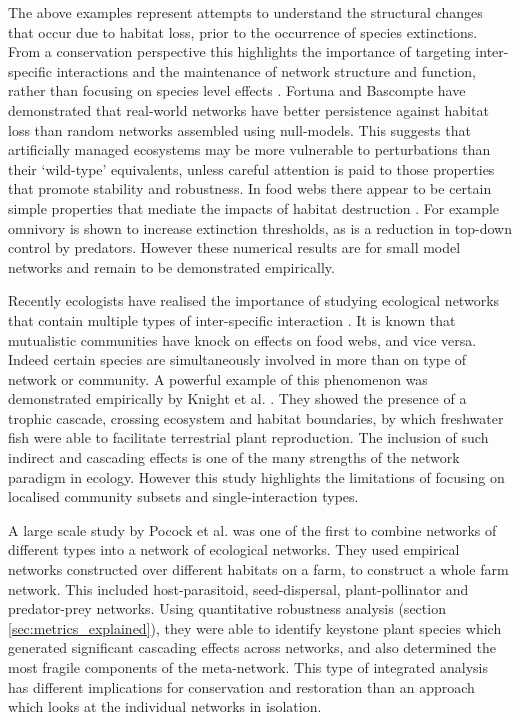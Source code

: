 The above examples represent attempts to understand the structural changes that occur due to habitat loss, prior to the occurrence of species extinctions. From a conservation perspective this highlights the importance of targeting inter-specific interactions and the maintenance of network structure and function, rather than focusing on species level effects \cite{memmott2007conservation}. Fortuna and Bascompte \cite{fortuna2006habitat} have demonstrated that real-world networks have better persistence against habitat loss than random networks assembled using null-models. This suggests that artificially managed ecosystems may be more vulnerable to perturbations than their `wild-type' equivalents, unless careful attention is paid to those properties that promote stability and robustness. In food webs there appear to be certain simple properties that mediate the impacts of habitat destruction \cite{melian2002food}. For example omnivory is shown to increase extinction thresholds, as is a reduction in top-down control by predators. However these numerical results are for small model networks and remain to be demonstrated empirically.     



Recently ecologists have realised the importance of studying ecological networks that contain multiple types of inter-specific interaction \cite{fontaine2011ecological, kefi2012more, montoya2015functional}. It is known that mutualistic communities have knock on effects on food webs, and vice versa. Indeed certain species are simultaneously involved in more than on type of network or community. A powerful example of this phenomenon was demonstrated empirically by Knight et al. \cite{knight2005trophic}. They showed the presence of a trophic cascade, crossing ecosystem and habitat boundaries, by which freshwater fish were able to facilitate terrestrial plant reproduction. The inclusion of such indirect and cascading effects is one of the many strengths of the network paradigm in ecology. However this study highlights the limitations of focusing on localised community subsets and single-interaction types.

A large scale study by Pocock et al. \cite{pocock2012robustness} was one of the first to combine networks of different types into a network of ecological networks. They used empirical networks constructed over different habitats on a farm, to construct a whole farm network. This included host-parasitoid, seed-dispersal, plant-pollinator and predator-prey networks. Using quantitative robustness analysis (section \ref{sec:metrics_explained}), they were able to identify keystone plant species which generated significant cascading effects across networks, and also determined the most fragile components of the meta-network. This type of integrated analysis has different implications for conservation and restoration than an approach which looks at the individual networks in isolation.


